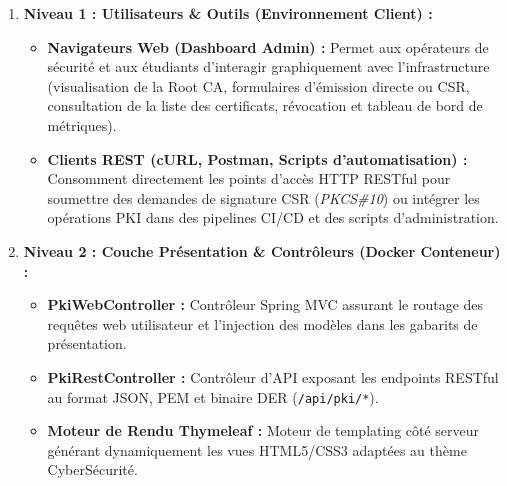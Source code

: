 \documentclass[12pt,a4paper]{report}
\begin{document}
\begin{enumerate}
    \item \textbf{Niveau 1 : Utilisateurs \& Outils (Environnement Client) :}
    \begin{itemize}
        \item \textbf{Navigateurs Web (Dashboard Admin) :} Permet aux opérateurs de sécurité et aux étudiants d'interagir graphiquement avec l'infrastructure (visualisation de la Root CA, formulaires d'émission directe ou CSR, consultation de la liste des certificats, révocation et tableau de bord de métriques).
        \item \textbf{Clients REST (cURL, Postman, Scripts d'automatisation) :} Consomment directement les points d'accès HTTP RESTful pour soumettre des demandes de signature CSR (\textit{PKCS\#10}) ou intégrer les opérations PKI dans des pipelines CI/CD et des scripts d'administration.
    \end{itemize}

    \item \textbf{Niveau 2 : Couche Présentation \& Contrôleurs (Docker Conteneur) :}
    \begin{itemize}
        \item \textbf{PkiWebController :} Contrôleur Spring MVC assurant le routage des requêtes web utilisateur et l'injection des modèles dans les gabarits de présentation.
        \item \textbf{PkiRestController :} Contrôleur d'API exposant les endpoints RESTful au format JSON, PEM et binaire DER (\texttt{/api/pki/*}).
        \item \textbf{Moteur de Rendu Thymeleaf :} Moteur de templating côté serveur générant dynamiquement les vues HTML5/CSS3 adaptées au thème CyberSécurité.
    \end{itemize}


\end{enumerate}
\end{document}
